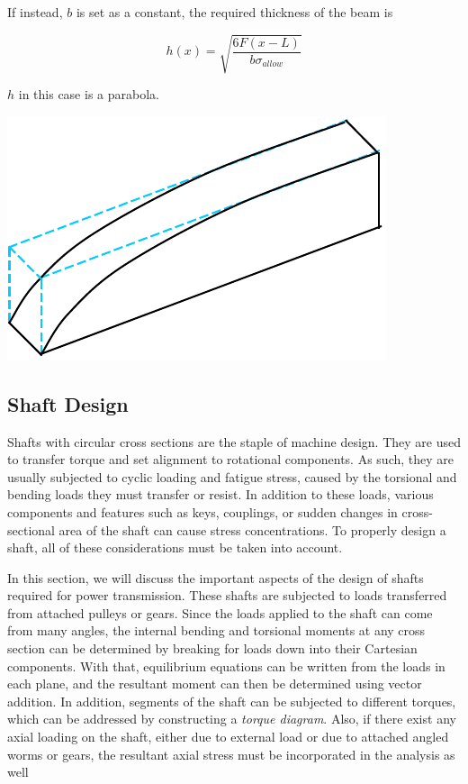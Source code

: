 \documentclass[a4paper,openany,nobib]{tufte-book}
\begin{document}
{{If instead, \(b\) is set as a constant, the required thickness of the beam
is

$$h(x) = \sqrt{\dfrac{6F(x-L)}{b \sigma_{allow}}}$$

\(h\) in this case is a parabola.


\begin{center}
\includegraphics[width=.9\linewidth]{pictures/Simple-load-bearing/fully-stressed-parabola.pdf}
\end{center}

\subsection{Shaft Design}
\label{shaft-design}
Shafts with circular cross sections are the staple of machine design.
They are used to transfer torque and set alignment to rotational
components. As such, they are usually subjected to cyclic loading and
fatigue stress, caused by the torsional and bending loads they must
transfer or resist. In addition to these loads, various components and
features such as keys, couplings, or sudden changes in cross-sectional
area of the shaft can cause stress concentrations. To properly design a
shaft, all of these considerations must be taken into account.

In this section, we will discuss the important aspects of the design of
shafts required for power transmission. These shafts are subjected to
loads transferred from attached pulleys or gears. Since the loads
applied to the shaft can come from many angles, the internal bending and
torsional moments at any cross section can be determined by breaking for
loads down into their Cartesian components. With that, equilibrium
equations can be written from the loads in each plane, and the resultant
moment can then be determined using vector addition. In addition,
segments of the shaft can be subjected to different torques, which can
be addressed by constructing a \emph{torque diagram}. Also, if there exist
any axial loading on the shaft, either due to external load or due to
attached angled worms or gears, the resultant axial stress must be
incorporated in the analysis as well

}}
\end{document}
